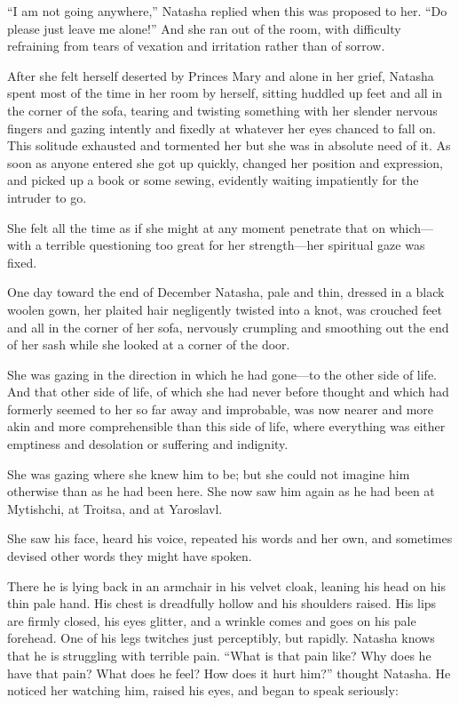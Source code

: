 ``I am not going anywhere,'' Natasha replied when this was
proposed to her. ``Do please just leave me alone!'' And she ran
out of the room, with difficulty refraining from tears of
vexation and irritation rather than of sorrow.

After she felt herself deserted by Princes Mary and alone in her
grief, Natasha spent most of the time in her room by herself,
sitting huddled up feet and all in the corner of the sofa,
tearing and twisting something with her slender nervous fingers
and gazing intently and fixedly at whatever her eyes chanced to
fall on. This solitude exhausted and tormented her but she was in
absolute need of it. As soon as anyone entered she got up
quickly, changed her position and expression, and picked up a
book or some sewing, evidently waiting impatiently for the
intruder to go.

She felt all the time as if she might at any moment penetrate
that on which---with a terrible questioning too great for her
strength---her spiritual gaze was fixed.

One day toward the end of December Natasha, pale and thin,
dressed in a black woolen gown, her plaited hair negligently
twisted into a knot, was crouched feet and all in the corner of
her sofa, nervously crumpling and smoothing out the end of her
sash while she looked at a corner of the door.

She was gazing in the direction in which he had gone---to the
other side of life. And that other side of life, of which she had
never before thought and which had formerly seemed to her so far
away and improbable, was now nearer and more akin and more
comprehensible than this side of life, where everything was
either emptiness and desolation or suffering and indignity.

She was gazing where she knew him to be; but she could not
imagine him otherwise than as he had been here. She now saw him
again as he had been at Mytishchi, at Troitsa, and at Yaroslavl.

She saw his face, heard his voice, repeated his words and her
own, and sometimes devised other words they might have spoken.

There he is lying back in an armchair in his velvet cloak,
leaning his head on his thin pale hand. His chest is dreadfully
hollow and his shoulders raised. His lips are firmly closed, his
eyes glitter, and a wrinkle comes and goes on his pale
forehead. One of his legs twitches just perceptibly, but
rapidly. Natasha knows that he is struggling with terrible
pain. ``What is that pain like? Why does he have that pain? What
does he feel? How does it hurt him?'' thought Natasha. He noticed
her watching him, raised his eyes, and began to speak seriously:

